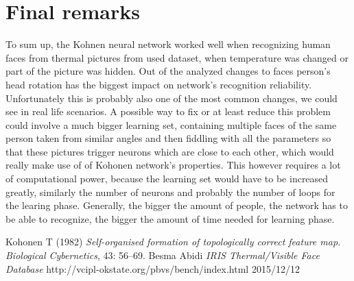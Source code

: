 \documentclass[pdftex]{article}
\begin{document}
\section{Final remarks}
To sum up, the Kohnen neural network worked well when recognizing human faces from thermal pictures from used dataset, when temperature was changed or part of the picture was hidden. Out of the analyzed changes to faces person's head rotation has the biggest impact on network's recognition reliability. Unfortunately this is probably also one of the most common changes, we could see in real life scenarios. A possible way to fix or at least reduce this problem could involve a much bigger learning set, containing multiple faces of the same person taken from similar angles and then fiddling with all the parameters so that these pictures trigger neurons which are close to each other, which would really make use of of Kohonen network's properties. This however requires a lot of computational power, because the learning set would have to be increased greatly, similarly the number of neurons and probably the number of loops for the learing phase. Generally, the bigger the amount of people, the network has to be able to recognize, the bigger the amount of time needed for learning phase.

 \begin{thebibliography}{1}
 Kohonen T (1982) {\em Self-organised formation of topologically correct feature
map. Biological Cybernetics}, 43: 56–69.
 Besma Abidi {\em IRIS Thermal/Visible Face Database} http://vcipl-okstate.org/pbvs/bench/index.html 2015/12/12
\end{thebibliography}
\end{document}
